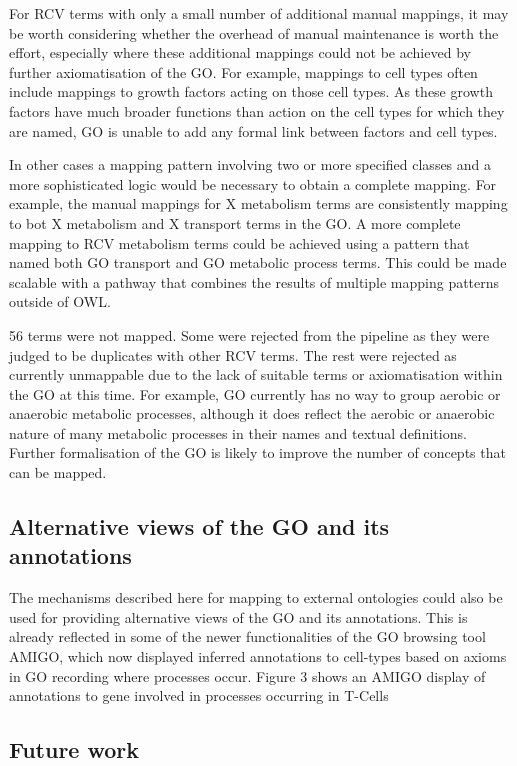 \documentclass[runningheads,a4paper]{llncs}
\begin{document}
{For RCV terms with only a small number of additional manual mappings, it may be worth considering whether the overhead of manual maintenance is worth the effort, especially where these additional mappings could not be achieved by further axiomatisation of the GO.  For example, mappings to cell types often include mappings to growth factors acting on those cell types.  As these growth factors have much broader functions than action on the cell types for which they are named, GO is unable to add any formal link between factors and cell types.

In other cases a mapping pattern involving two or more specified classes and a more sophisticated logic would be necessary to obtain a complete mapping.  For example, the manual mappings for X metabolism terms are consistently mapping to bot X metabolism and X transport terms in the GO. A more complete mapping to RCV metabolism terms could be achieved using a pattern that named both GO transport and GO metabolic process terms.  This could be made scalable with a pathway that combines the results of multiple mapping patterns outside of OWL.

56 terms were not mapped.  Some were rejected from the pipeline as they were judged to be duplicates with other RCV terms.  The rest were rejected as currently unmappable due to the lack of suitable terms or axiomatisation within the GO at this time.  For example, GO currently has no way to group aerobic or anaerobic metabolic processes, although it does reflect the aerobic or anaerobic nature of many metabolic processes in their names and textual definitions. Further formalisation of the GO is likely to improve the number of concepts that can be mapped.

\subsection{Alternative views of the GO and its annotations}

The mechanisms described here for mapping to external ontologies could also be used for providing alternative views of the GO and its annotations.  This is already reflected in some of the newer functionalities of the GO browsing tool AMIGO, which now displayed inferred annotations to cell-types based on axioms in GO recording where processes occur.  Figure 3 shows an AMIGO display of annotations to gene involved in processes occurring in T-Cells

\subsection{Future work}

}
\end{document}
